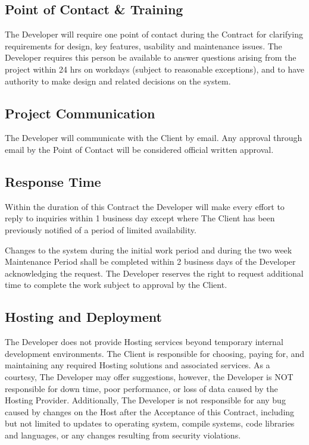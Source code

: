 \documentclass[a4paper,12pt]{article} %
\begin{document}

\subsection{Point of Contact \& Training}

The Developer will require one point of contact during the Contract for clarifying requirements for design, key features, usability and maintenance issues. The Developer requires this person be available to answer questions arising from the project within 24 hrs on workdays (subject to reasonable exceptions), and to have authority to make design and related decisions on the system.


\subsection{Project Communication}

The Developer will communicate with the Client by email. Any approval through email by the Point of Contact will be considered official written approval.


\subsection{Response Time}

Within the duration of this Contract the Developer will make every effort to reply to inquiries within 1 business day except where The Client has been previously notified of a period of limited availability.

Changes to the system during the initial work period and during the two week Maintenance Period shall be completed within 2 business days of the Developer acknowledging the request. The Developer reserves the right to request additional time to complete the work subject to approval by the Client.


\subsection{Hosting and Deployment}

The Developer does not provide Hosting services beyond temporary internal development environments. The Client is responsible for choosing, paying for, and maintaining any required Hosting solutions and associated services. As a courtesy, The Developer may offer suggestions, however, the Developer is NOT responsible for down time, poor performance, or loss of data caused by the Hosting Provider. Additionally, The Developer is not responsible for any bug caused by changes on the Host after the Acceptance of this Contract, including but not limited to updates to operating system, compile systems, code libraries and languages, or any changes resulting from security violations.
\end{document}
